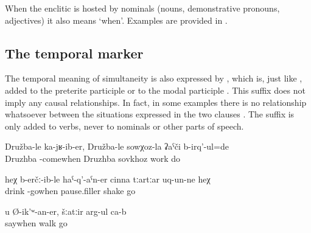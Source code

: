 When the enclitic is hosted by nominals (nouns, demonstrative pronouns, adjectives) it also means `when'. Examples are provided in .





\subsection{The temporal marker  }
\label{sec:enclitic =er}

The temporal meaning of simultaneity is also expressed by , which is, just like , added to the preterite participle or to the modal participle . This suffix does not imply any causal relationships. In fact, in some examples there is no relationship whatsoever between the situations expressed in the two clauses . The suffix is only added to verbs, never to nominals or other parts of speech.
%
\begin{exe}
	\ex	\label{ex:When I moved to Druzhba, I worked in the sovkhoz in Druzhba}
	\gll	Družba-le	ka-jʁ-ib-er,	Družba-le	sowχoz-la	ʡaˁči	b-irq'-ul=de\\
		Druzhba	-comewhen	Druzhba	sovkhoz	work	do\\
	\glt	{}

	\ex	\label{ex:‎When he was drunk and went there, he staggered}
	\gll	heχ	b-erčː-ib-le	haˁ-q'-aˁn-er	cinna	tːartːar	uq-un-ne	heχ\\
			drink	-gowhen	pause.filler	shake	go	\\
	\glt	{}

	\ex	\label{ex:‎As you (masc.) say, they are walking around}
	\gll	u	Ø-ik'ʷ-an-er,	šːatːir	arg-ul	ca-b\\
			saywhen	walk	go	\\
	\glt	{}
\end{exe}


